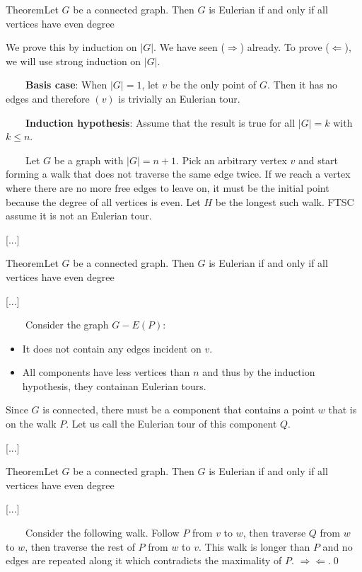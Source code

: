 \documentclass{beamer}
\def\bl[#1]#2{\begin{block}{#1}#2\end{block}}
\begin{document}
\begin{frame}
\bl[Theorem]{Let $G$ be a connected graph. Then $G$ is Eulerian if and only if all vertices have even degree}
We prove this by induction on $|G|$.
We have seen ($\Rightarrow$) already. To prove ($\Leftarrow$), we will use strong induction on $|G|$.

~~~~\textbf{Basis case}: When $|G|=1$, let $v$ be the only point of $G$. Then it has no edges and therefore $(v)$ is trivially an Eulerian tour.

~~~~\textbf{Induction hypothesis}: Assume that the result is true for all $|G|=k$ with $k\leq n$. 

~~~~Let $G$ be a graph with $|G|=n+1$. Pick an arbitrary vertex $v$ and start forming a walk that does not traverse the same edge twice. If we reach a vertex where there are no more free edges to leave on, it must be the initial point because the degree of all vertices is even. Let $H$ be the longest such walk. FTSC assume it is not an Eulerian tour.

[...]
\end{frame}

\begin{frame}
\bl[Theorem]{Let $G$ be a connected graph. Then $G$ is Eulerian if and only if all vertices have even degree}
[...]

~~~~Consider the graph $G-E(P)$:
\begin{itemize}
\item  It does not contain any edges incident on $v$. 
\item All components have less vertices than $n$ and thus by the induction hypothesis, they containan Eulerian tours. 
\end{itemize}
Since $G$ is connected, there must be a component that contains a point $w$ that is on the walk $P$. Let us call the Eulerian tour of this component $Q$.

[...]
\end{frame}

\begin{frame}
\bl[Theorem]{Let $G$ be a connected graph. Then $G$ is Eulerian if and only if all vertices have even degree}
[...]

~~~~Consider the following walk. Follow $P$ from $v$ to $w$, then traverse $Q$ from $w$ to $w$, then traverse the rest of $P$ from $w$ to $v$. This walk is longer than $P$ and no edges are repeated along it which contradicts the maximality of $P$. $\Rightarrow\Leftarrow$.\qed
\end{frame}
\end{document}
